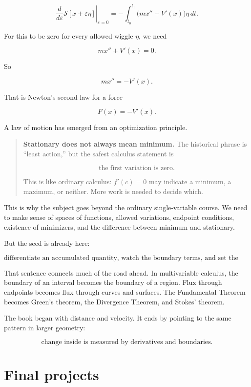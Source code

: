 \[
\left.\frac{d}{d\varepsilon}\mathcal{S}[x+\varepsilon\eta]\right|_{\varepsilon=0}
=
-
\int_{t_0}^{t_1}
\bigl(mx''+V'(x)\bigr)\eta\,dt.
\]

For this to be zero for every allowed wiggle \(\eta\), we need

\[
mx''+V'(x)=0.
\]

So

\[
\boxed{
mx''=-V'(x).
}
\]

That is Newton's second law for a force

\[
F(x)=-V'(x).
\]

A law of motion has emerged from an optimization principle.

\begin{quote}
\textbf{Stationary does not always mean minimum.}
The historical phrase is ``least action,'' but the safest calculus statement is

\[
\text{the first variation is zero.}
\]

This is like ordinary calculus: \(f'(c)=0\) may indicate a minimum, a maximum, or
neither.  More work is needed to decide which.
\end{quote}

This is why the subject goes beyond the ordinary single-variable course.  We need to
make sense of spaces of functions, allowed variations, endpoint conditions, existence of
minimizers, and the difference between minimum and stationary.

But the seed is already here:

\[
\boxed{
\text{differentiate an accumulated quantity, watch the boundary terms, and set the first variation to zero.}
}
\]

That sentence connects much of the road ahead.  In multivariable calculus, the
boundary of an interval becomes the boundary of a region.  Flux through endpoints
becomes flux through curves and surfaces.  The Fundamental Theorem becomes
Green's theorem, the Divergence Theorem, and Stokes' theorem.

The book began with distance and velocity.  It ends by pointing to the same pattern in
larger geometry:

\[
\boxed{
\text{change inside is measured by derivatives and boundaries.}
}
\]

\section{Final projects}
\label{sec:final-projects}

